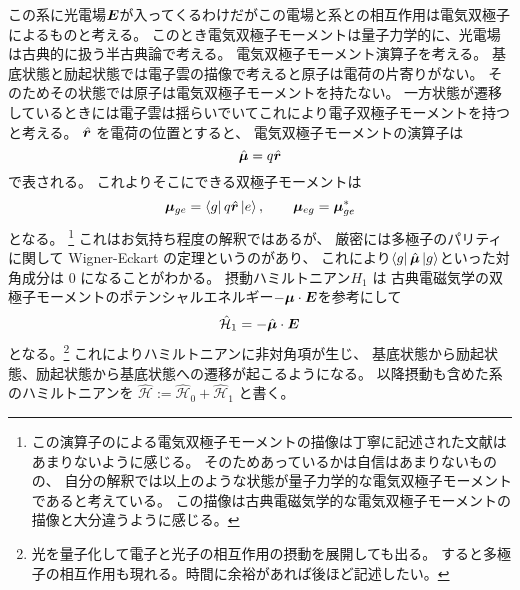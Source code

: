 \documentclass[11pt,dvipdfmx,a4paper]{jsarticle}
\begin{document}
この系に光電場\(\vb*{E}\)が入ってくるわけだがこの電場と系との相互作用は電気双極子によるものと考える。
このとき電気双極子モーメントは量子力学的に、光電場は古典的に扱う半古典論で考える。
電気双極子モーメント演算子を考える。
基底状態と励起状態では電子雲の描像で考えると原子は電荷の片寄りがない。
そのためその状態では原子は電気双極子モーメントを持たない。
一方状態が遷移しているときには電子雲は揺らいでいてこれにより電子双極子モーメントを持つと考える。
\(\hat{\vb*{r}}\) を電荷の位置とすると、
電気双極子モーメントの演算子は
\begin{equation}
	\hat{\vb*{\mu}} = q \hat{\vb*{r}}
\end{equation}
で表される。
これよりそこにできる双極子モーメントは
\begin{equation}
	\vb*{\mu}_{ge} = \bra{g}q\hat{\vb*{r}}\ket{e},\qquad \vb*{\mu}_{eg} = \vb*{\mu}_{ge}^{*}
\end{equation}
となる。
\footnote{この演算子のによる電気双極子モーメントの描像は丁寧に記述された文献はあまりないように感じる。
そのためあっているかは自信はあまりないものの、
自分の解釈では以上のような状態が量子力学的な電気双極子モーメントであると考えている。
この描像は古典電磁気学的な電気双極子モーメントの描像と大分違うように感じる。}
これはお気持ち程度の解釈ではあるが、
厳密には多極子のパリティに関して Wigner-Eckart の定理というのがあり、
これにより\(\bra{g}\hat{\vb*{\mu}}\ket{g}\)といった対角成分は \(0\) になることがわかる。
摂動ハミルトニアン\(H_1\) は
古典電磁気学の双極子モーメントのポテンシャルエネルギー\(-\vb*{\mu}\cdot\vb*{E}\)を参考にして
\begin{equation}
	\hat{\mathcal{H}}_1 = - \hat{\vb*{\mu}}\cdot\vb*{E}
\end{equation}
となる。\footnote{光を量子化して電子と光子の相互作用の摂動を展開しても出る。
すると多極子の相互作用も現れる。時間に余裕があれば後ほど記述したい。}
これによりハミルトニアンに非対角項が生じ、
基底状態から励起状態、励起状態から基底状態への遷移が起こるようになる。
以降摂動も含めた系のハミルトニアンを \(\hat{\mathcal{H}} := \hat{\mathcal{H}}_0 + \hat{\mathcal{H}}_1\) と書く。
\end{document}
